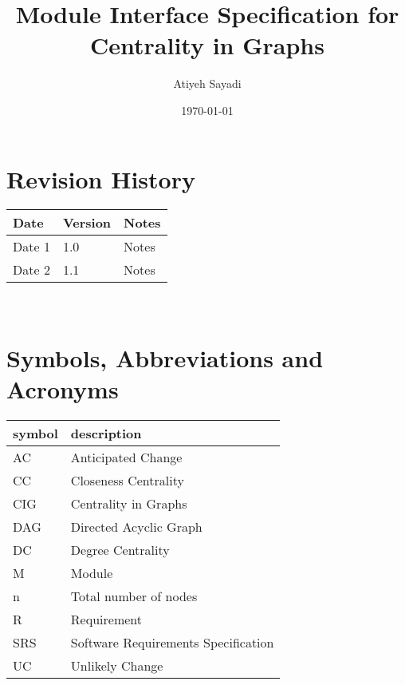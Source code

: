 \documentclass[12pt, titlepage]{article}
\begin{document}
\title{Module Interface Specification for Centrality in Graphs}

\author{Atiyeh Sayadi}

\date{\today}

\maketitle


\section{Revision History}

\begin{tabularx}{\textwidth}{p{3cm}p{2cm}X}
\toprule {\bf Date} & {\bf Version} & {\bf Notes}\\
\midrule
Date 1 & 1.0 & Notes\\
Date 2 & 1.1 & Notes\\
\bottomrule
\end{tabularx}

~\newpage

\section{Symbols, Abbreviations and Acronyms}

\renewcommand{\arraystretch}{1.2}
\begin{tabular}{l l} 
  \toprule		
  \textbf{symbol} & \textbf{description}\\
  \midrule 
  AC & Anticipated Change\\
CC & Closeness Centrality\\
  CIG& Centrality in Graphs\\
  DAG & Directed Acyclic Graph \\
DC & Degree Centrality\\
  M & Module \\
 n & Total number of nodes \\
  R & Requirement\\
  SRS & Software Requirements Specification\\
  UC & Unlikely Change \\
  \bottomrule
\end{tabular}\\

\newpage

\tableofcontents

\newpage
\end{document}
